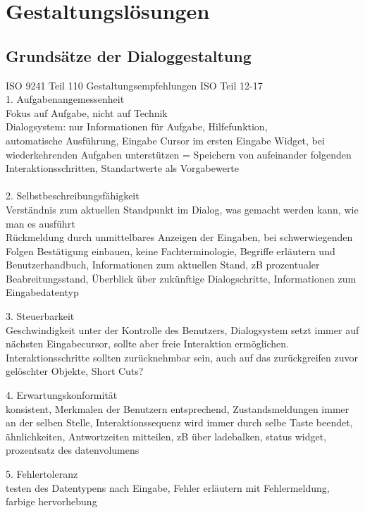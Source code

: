 
\section{Gestaltungslösungen}

\subsection{Grundsätze der Dialoggestaltung}
 ISO 9241 Teil 110
 Gestaltungsempfehlungen ISO Teil 12-17
\\
 1. Aufgabenangemessenheit\\
 	Fokus auf Aufgabe, nicht auf Technik\\
 	Dialogsystem: nur Informationen für Aufgabe, Hilfefunktion, \\automatische Ausführung, Eingabe Cursor im ersten Eingabe Widget, bei wiederkehrenden Aufgaben unterstützen = Speichern von aufeinander folgenden Interaktionsschritten, Standartwerte als Vorgabewerte\\
\\
 2. Selbstbeschreibungsfähigkeit\\
    Verständnis zum aktuellen Standpunkt im Dialog, was gemacht werden kann, wie man es ausführt\\
    Rückmeldung durch unmittelbares Anzeigen der Eingaben, bei schwerwiegenden Folgen Bestätigung einbauen, keine Fachterminologie, Begriffe erläutern und Benutzerhandbuch, Informationen zum aktuellen Stand, zB prozentualer Beabreitungsstand, Überblick über zukünftige Dialogschritte, Informationen zum Eingabedatentyp

 3. Steuerbarkeit\\
 	Geschwindigkeit unter der Kontrolle des Benutzers, Dialogsystem setzt immer auf nächsten Eingabecursor, sollte aber freie Interaktion ermöglichen. Interaktionsschritte sollten zurücknehmbar sein, auch auf das zurückgreifen zuvor gelöschter Objekte, Short Cuts?

 4. Erwartungskonformität\\
 	konsistent, Merkmalen der Benutzern entsprechend, Zustandsmeldungen immer an der selben Stelle, Interaktionssequenz wird immer durch selbe Taste beendet, ähnlichkeiten, Antwortzeiten mitteilen, zB über ladebalken, status widget, prozentsatz des datenvolumens

 5. Fehlertoleranz\\
 	testen des Datentypens nach Eingabe, Fehler erläutern mit Fehlermeldung, farbige hervorhebung 

